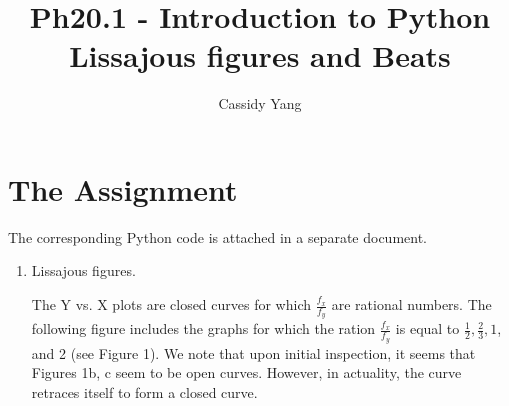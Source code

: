 \documentclass{article}
\begin{document}
\title{Ph20.1 - Introduction to Python\\ Lissajous figures and Beats}
\author{Cassidy Yang}
\maketitle
\pagestyle{fancy}

\section{The Assignment}

The corresponding Python code is attached in a separate document.

\begin{enumerate}
	\item Lissajous figures.
	
	The Y vs. X plots are closed curves for which $\frac{f_x}{f_y}$ are rational numbers. The following figure includes the graphs for which the ration $\frac{f_x}{f_y}$ is equal to $\frac{1}{2}, \frac{2}{3}, 1$, and 2 (see Figure 1). We note that upon initial inspection, it seems that Figures 1b, c seem to be open curves. However, in actuality, the curve retraces itself to form a closed curve.
	

\end{enumerate}
\end{document}
